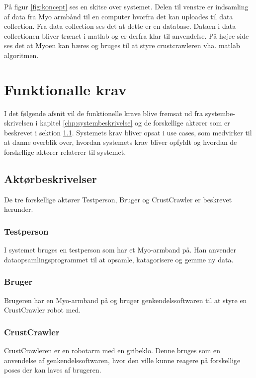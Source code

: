På figur \ref{fig:koncept} ses en skitse over systemet. Delen til venstre er indsamling af data fra Myo armbånd til en computer hvorfra det kan uploades til data collection. Fra data collection ses det at dette er en database. Dataen i data collectionen bliver trænet i matlab og er derfra klar til anvendelse. På højre side ses det at Myoen kan bæres og bruges til at styre crustcrawleren vha. matlab algoritmen.


\thispagestyle{fancy}
\section{Funktionalle krav}
\label{sec:funktionellekrav}
I det følgende afsnit vil de funktionelle krave blive fremsat ud fra systembe- skrivelsen i kapitel \ref{chp:systembeskrivelse} og de forskellige aktører som er beskrevet i sektion \ref{sec:aktorbeskrivelser}.
Systemets krav bliver opsat i use cases, som medvirker til at danne overblik over, hvordan systemets krav bliver opfyldt og hvordan de forskellige aktører relaterer til systemet.

\subsection{Aktørbeskrivelser}
\label{sec:aktorbeskrivelser}
De tre forskellige aktører Testperson, Bruger og CrustCrawler er beskrevet herunder.

\subsubsection{Testperson}
I systemet bruges en testperson som har et Myo-armband på. Han anvender dataopsamlingsprogrammet til at opsamle, katagorisere og gemme ny data.

\subsubsection{Bruger}
Brugeren har en Myo-armband på og bruger genkendelssoftwaren til at styre en CrustCrawler robot med.

\subsubsection{CrustCrawler}
CrustCrawleren er en robotarm med en gribeklo. Denne bruges som en anvendelse af genkendelssoftwaren, hvor den ville kunne reagere på forskellige poses der kan laves af brugeren.

